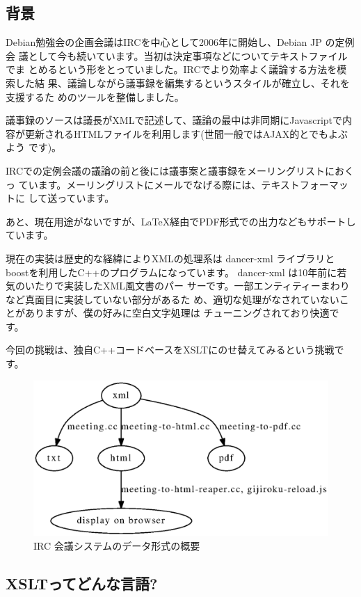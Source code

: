 \documentclass[mingoth,a4paper]{jsarticle}
\begin{document}
\subsection{背景}

Debian勉強会の企画会議はIRCを中心として2006年に開始し、Debian JP の定例会
議として今も続いています。当初は決定事項などについてテキストファイルでま
とめるという形をとっていました。IRCでより効率よく議論する方法を模索した結
果、議論しながら議事録を編集するというスタイルが確立し、それを支援するた
めのツールを整備しました。

議事録のソースは議長がXMLで記述して、議論の最中は非同期にJavascriptで内
容が更新されるHTMLファイルを利用します(世間一般ではAJAX的とでもよぶよう
です)。

IRCでの定例会議の議論の前と後には議事案と議事録をメーリングリストにおくっ
ています。メーリングリストにメールでなげる際には、テキストフォーマットに
して送っています。

あと、現在用途がないですが、\LaTeX 経由でPDF形式での出力などもサポートし
ています。

現在の実装は歴史的な経緯によりXMLの処理系は dancer-xml ライブラリと
boostを利用したC++のプログラムになっています。
dancer-xml\cite{dancer-xml} は10年前に若気のいたりで実装したXML風文書のパー
サーです。一部エンティティーまわりなど真面目に実装していない部分があるた
め、適切な処理がなされていないことがありますが、僕の好みに空白文字処理は
チューニングされており快適です。

今回の挑戦は、独自C++コードベースをXSLTにのせ替えてみるという挑戦です。

\begin{figure}[ht]
 \begin{center}
  \includegraphics[width=0.5\hsize]{image201106/ircsystem.eps}
 \end{center}
\label{fig:ircsystem-general}\caption{IRC 会議システムのデータ形式の概要}
\end{figure}

\subsection{XSLTってどんな言語?}
\end{document}
